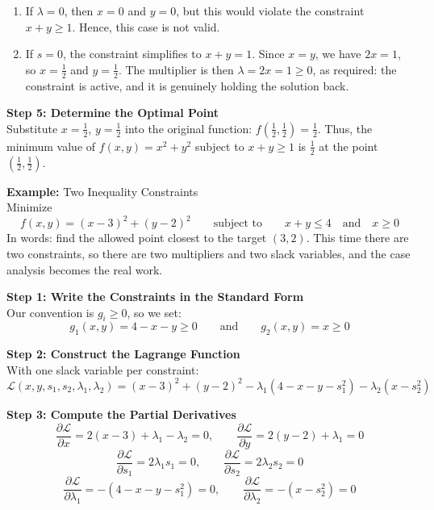 \documentclass[]{article}
\begin{document}
	\begin{enumerate}
		\item If $\lambda = 0$, then $x = 0$ and $y = 0$, but this would violate the constraint $x + y \geq 1$.
		Hence, this case is not valid.
		\item If $s = 0$, the constraint simplifies to $x + y = 1$.
		Since $x = y$, we have $2x = 1$, so $x = \frac{1}{2}$ and $y = \frac{1}{2}$.
		The multiplier is then $\lambda = 2x = 1 \geq 0$, as required: the constraint is active, and it is genuinely holding the solution back.
	\end{enumerate}
	
	\textbf{Step 5: Determine the Optimal Point}\\
	Substitute $x = \frac{1}{2}$, $y = \frac{1}{2}$ into the original function:
	$f\left(\frac{1}{2}, \frac{1}{2}\right) = \frac{1}{2}$.
	Thus, the minimum value of $f(x, y) = x^2 + y^2$ subject to $x + y \geq 1$ is $\frac{1}{2}$ at the point $\left(\frac{1}{2}, \frac{1}{2}\right)$.

	\vspace{1cm}
	\textbf{Example:}
	Two Inequality Constraints\\
	Minimize
	$$
	f(x, y) = (x-3)^2 + (y-2)^2
	\qquad \text{subject to} \qquad
	x + y \leq 4
	\quad \text{and} \quad
	x \geq 0
	$$
	In words: find the allowed point closest to the target $(3,2)$.
	This time there are two constraints, so there are two multipliers and two slack variables, and the case analysis becomes the real work.

	\textbf{Step 1: Write the Constraints in the Standard Form}\\
	Our convention is $g_i \geq 0$, so we set:
	$$
	g_1(x, y) = 4 - x - y \geq 0
	\qquad \text{and} \qquad
	g_2(x, y) = x \geq 0
	$$

	\textbf{Step 2: Construct the Lagrange Function}\\
	With one slack variable per constraint:
	$$
	\mathcal{L}(x, y, s_1, s_2, \lambda_1, \lambda_2)
	= (x-3)^2 + (y-2)^2
	- \lambda_1 \left( 4 - x - y - s_1^2 \right)
	- \lambda_2 \left( x - s_2^2 \right)
	$$

	\textbf{Step 3: Compute the Partial Derivatives}\\
	$$
	\frac{\partial \mathcal{L}}{\partial x} = 2(x-3) + \lambda_1 - \lambda_2 = 0,
	\qquad
	\frac{\partial \mathcal{L}}{\partial y} = 2(y-2) + \lambda_1 = 0
	$$
	$$
	\frac{\partial \mathcal{L}}{\partial s_1} = 2 \lambda_1 s_1 = 0,
	\qquad
	\frac{\partial \mathcal{L}}{\partial s_2} = 2 \lambda_2 s_2 = 0
	$$
	$$
	\frac{\partial \mathcal{L}}{\partial \lambda_1} = -\left( 4 - x - y - s_1^2 \right) = 0,
	\qquad
	\frac{\partial \mathcal{L}}{\partial \lambda_2} = -\left( x - s_2^2 \right) = 0
	$$
\end{document}
